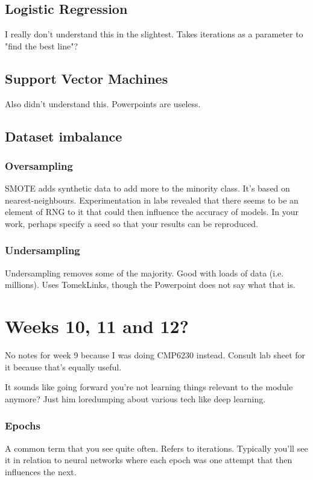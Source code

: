\documentclass[12pt]{report}
\begin{document}
\subsection{Logistic Regression}
I really don't understand this in the slightest.
Takes iterations as a parameter to "find the best line"?

\subsection{Support Vector Machines}
Also didn't understand this. Powerpoints are useless.


\subsection{Dataset imbalance}
\subsubsection{Oversampling}
SMOTE adds synthetic data to add more to the minority class. It's based on nearest-neighbours.
Experimentation in labs revealed that there seems to be an element of RNG to it that could then 
influence the accuracy of models. In your work, perhaps specify a seed so that your results 
can be reproduced.

\subsubsection{Undersampling}
Undersampling removes some of the majority. Good with loads of data (i.e. millions).
Uses TomekLinks, though the Powerpoint does not say what that is.

\section{Weeks 10, 11 and 12?}
No notes for week 9 because I was doing CMP6230 instead. Consult lab sheet for it because that's equally useful.

It sounds like going forward you're not learning things relevant to the module anymore? Just him loredumping about various 
tech like deep learning.

\subsubsection{Epochs}
A common term that you see quite often. Refers to iterations. Typically you'll see it in relation to neural networks 
where each epoch was one attempt that then influences the next.
\end{document}
